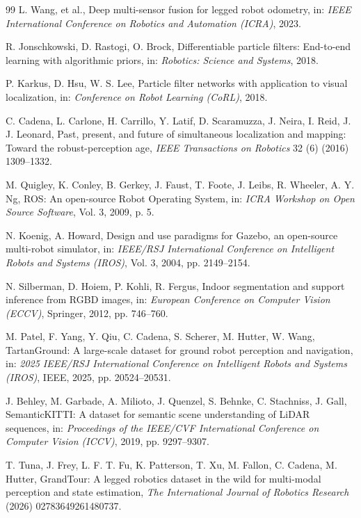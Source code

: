 \documentclass[11pt, a4paper]{article}
\begin{document}
{{{\begin{thebibliography}{99}
L. Wang, et al., Deep multi-sensor fusion for legged robot odometry, in: \textit{IEEE International Conference on Robotics and Automation (ICRA)}, 2023.

R. Jonschkowski, D. Rastogi, O. Brock, Differentiable particle filters: End-to-end learning with algorithmic priors, in: \textit{Robotics: Science and Systems}, 2018.

P. Karkus, D. Hsu, W. S. Lee, Particle filter networks with application to visual localization, in: \textit{Conference on Robot Learning (CoRL)}, 2018.

C. Cadena, L. Carlone, H. Carrillo, Y. Latif, D. Scaramuzza, J. Neira, I. Reid, J. J. Leonard, Past, present, and future of simultaneous localization and mapping: Toward the robust-perception age, \textit{IEEE Transactions on Robotics} 32 (6) (2016) 1309--1332.

M. Quigley, K. Conley, B. Gerkey, J. Faust, T. Foote, J. Leibs, R. Wheeler, A. Y. Ng, ROS: An open-source Robot Operating System, in: \textit{ICRA Workshop on Open Source Software}, Vol. 3, 2009, p. 5.

N. Koenig, A. Howard, Design and use paradigms for Gazebo, an open-source multi-robot simulator, in: \textit{IEEE/RSJ International Conference on Intelligent Robots and Systems (IROS)}, Vol. 3, 2004, pp. 2149--2154.

N. Silberman, D. Hoiem, P. Kohli, R. Fergus, Indoor segmentation and support inference from RGBD images, in: \textit{European Conference on Computer Vision (ECCV)}, Springer, 2012, pp. 746--760.

M. Patel, F. Yang, Y. Qiu, C. Cadena, S. Scherer, M. Hutter, W. Wang, TartanGround: A large-scale dataset for ground robot perception and navigation, in: \textit{2025 IEEE/RSJ International Conference on Intelligent Robots and Systems (IROS)}, IEEE, 2025, pp. 20524--20531.

J. Behley, M. Garbade, A. Milioto, J. Quenzel, S. Behnke, C. Stachniss, J. Gall, SemanticKITTI: A dataset for semantic scene understanding of LiDAR sequences, in: \textit{Proceedings of the IEEE/CVF International Conference on Computer Vision (ICCV)}, 2019, pp. 9297--9307.

T. Tuna, J. Frey, L. F. T. Fu, K. Patterson, T. Xu, M. Fallon, C. Cadena, M. Hutter, GrandTour: A legged robotics dataset in the wild for multi-modal perception and state estimation, \textit{The International Journal of Robotics Research} (2026) 02783649261480737.

\end{thebibliography}
}}}
\end{document}
